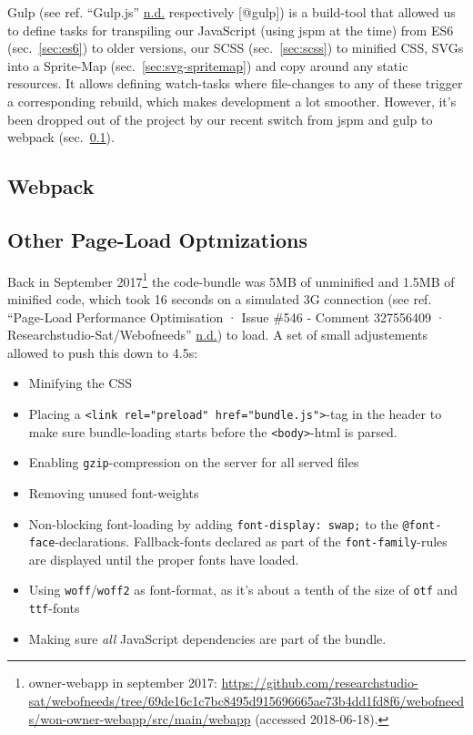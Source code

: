 \documentclass[a4paper,,tablecaptionabove]{scrbook}
\newcommand{\passthrough}[1]{#1}
\providecommand{\tightlist}{%
  \setlength{\itemsep}{0pt}\setlength{\parskip}{0pt}}
\begin{document}
Gulp (see ref. ``Gulp.js'' \protect\hyperlink{ref-gulpjs}{n.d.}
respectively {[}@gulp{]}) is a build-tool that allowed us to define
tasks for transpiling our JavaScript (using jspm at the time) from ES6
(sec.~\ref{sec:es6}) to older versions, our SCSS (sec.~\ref{sec:scss})
to minified CSS, SVGs into a Sprite-Map (sec.~\ref{sec:svg-spritemap})
and copy around any static resources. It allows defining watch-tasks
where file-changes to any of these trigger a corresponding rebuild,
which makes development a lot smoother. However, it's been dropped out
of the project by our recent switch from jspm and gulp to webpack
(sec.~\ref{sec:webpack}).

\hypertarget{sec:webpack}{%
\subsection{Webpack}\label{sec:webpack}}

\hypertarget{sec:page-load-optimizations}{%
\subsection{Other Page-Load
Optmizations}\label{sec:page-load-optimizations}}

Back in September 2017\footnote{owner-webapp in september 2017:
  \url{https://github.com/researchstudio-sat/webofneeds/tree/69de16c1c7bc8495d915696665ae73b4dd1fd8f6/webofneeds/won-owner-webapp/src/main/webapp}
  (accessed 2018-06-18).} the code-bundle was 5MB of unminified and
1.5MB of minified code, which took 16 seconds on a simulated 3G
connection (see ref. ``Page-Load Performance Optimisation · Issue \#546
- Comment 327556409 · Researchstudio-Sat/Webofneeds''
\protect\hyperlink{ref-Pageloadperformanceoptimisation}{n.d.}) to load.
A set of small adjustements allowed to push this down to 4.5s:

\begin{itemize}
\tightlist
\item
  Minifying the CSS
\item
  Placing a
  \passthrough{\lstinline!<link rel="preload" href="bundle.js">!}-tag in
  the header to make sure bundle-loading starts before the
  \passthrough{\lstinline!<body>!}-html is parsed.
\item
  Enabling \passthrough{\lstinline!gzip!}-compression on the server for
  all served files
\item
  Removing unused font-weights
\item
  Non-blocking font-loading by adding
  \passthrough{\lstinline!font-display: swap;!} to the
  \passthrough{\lstinline!@font-face!}-declarations. Fallback-fonts
  declared as part of the \passthrough{\lstinline!font-family!}-rules
  are displayed until the proper fonts have loaded.
\item
  Using \passthrough{\lstinline!woff!}/\passthrough{\lstinline!woff2!}
  as font-format, as it's about a tenth of the size of
  \passthrough{\lstinline!otf!} and \passthrough{\lstinline!ttf!}-fonts
\item
  Making sure \emph{all} JavaScript dependencies are part of the bundle.
\end{itemize}
\end{document}
